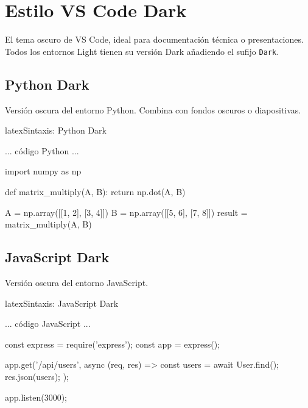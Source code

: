\section{Estilo VS Code Dark}
\label{sec:vscode-dark}

El tema oscuro de VS Code, ideal para documentación técnica o presentaciones.
Todos los entornos Light tienen su versión Dark añadiendo el sufijo \texttt{Dark}.

\subsection{Python Dark}

Versión oscura del entorno Python. Combina con fondos oscuros o diapositivas.

\begin{codigosimple}{latex}{Sintaxis: Python Dark}
\begin{pythoncodeDark}
  ... código Python ...
\end{pythoncodeDark}
\end{codigosimple}

\begin{pythoncodeDark}
import numpy as np

def matrix_multiply(A, B):
    return np.dot(A, B)

A = np.array([[1, 2], [3, 4]])
B = np.array([[5, 6], [7, 8]])
result = matrix_multiply(A, B)
\end{pythoncodeDark}

\subsection{JavaScript Dark}

Versión oscura del entorno JavaScript.

\begin{codigosimple}{latex}{Sintaxis: JavaScript Dark}
\begin{jscodeDark}
  ... código JavaScript ...
\end{jscodeDark}
\end{codigosimple}

\begin{jscodeDark}
const express = require('express');
const app = express();

app.get('/api/users', async (req, res) => {
    const users = await User.find();
    res.json(users);
});

app.listen(3000);
\end{jscodeDark}

